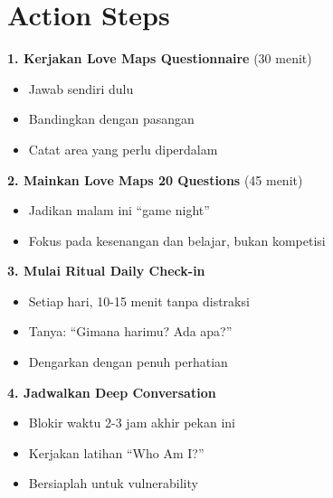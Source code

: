 \section{Action Steps}

\begin{exercisebox}
\textbf{1. Kerjakan Love Maps Questionnaire} (30 menit)
\begin{itemize}
    \item Jawab sendiri dulu
    \item Bandingkan dengan pasangan
    \item Catat area yang perlu diperdalam
\end{itemize}

\textbf{2. Mainkan Love Maps 20 Questions} (45 menit)
\begin{itemize}
    \item Jadikan malam ini ``game night''
    \item Fokus pada kesenangan dan belajar, bukan kompetisi
\end{itemize}

\textbf{3. Mulai Ritual Daily Check-in}
\begin{itemize}
    \item Setiap hari, 10-15 menit tanpa distraksi
    \item Tanya: ``Gimana harimu? Ada apa?''
    \item Dengarkan dengan penuh perhatian
\end{itemize}

\textbf{4. Jadwalkan Deep Conversation}
\begin{itemize}
    \item Blokir waktu 2-3 jam akhir pekan ini
    \item Kerjakan latihan ``Who Am I?''
    \item Bersiaplah untuk vulnerability
\end{itemize}
\end{exercisebox}
